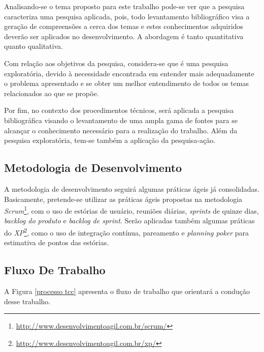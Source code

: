 Analisando-se o tema proposto para este trabalho pode-se ver que a pesquisa caracteriza uma pesquisa aplicada, pois, todo levantamento bibliográfico visa a geração de compreensões a cerca dos temas e estes conhecimentos adquiridos deverão ser aplicados no desenvolvimento. A abordagem é tanto quantitativa quanto qualitativa.

Com relação aos objetivos da pesquisa, considera-se que é uma pesquisa exploratória, devido à necessidade encontrada em entender mais adequadamente o problema apresentado e se obter um melhor entendimento de todos os temas relacionados ao que se propõe.

Por fim, no contexto dos procedimentos técnicos, será aplicada a pesquisa bibliográfica visando o levantamento de uma ampla gama de fontes para se alcançar o conhecimento necessário para a realização do trabalho. Além da pesquisa exploratória, tem-se também a aplicação da pesquisa-ação.

\subsection{Metodologia de Desenvolvimento}

A metodologia de desenvolvimento seguirá algumas práticas ágeis já consolidadas. Basicamente, pretende-se utilizar as práticas ágeis propostas na metodologia \textit{Scrum}\footnote{\url{http://www.desenvolvimentoagil.com.br/scrum/}}, com o uso de estórias de usuário, reuniões diárias, \textit{sprints} de quinze dias, \textit{backlog do produto} e \textit{backlog de sprint}. Serão aplicadas também algumas práticas do \textit{XP}\footnote{\url{http://www.desenvolvimentoagil.com.br/xp/}}, como o uso de integração contínua, pareamento e \textit{planning poker} para estimativa de pontos das estórias.

\subsection{Fluxo De Trabalho}

A Figura \ref{processo tcc} apresenta o fluxo de trabalho que orientará a condução desse trabalho.

\newpage

